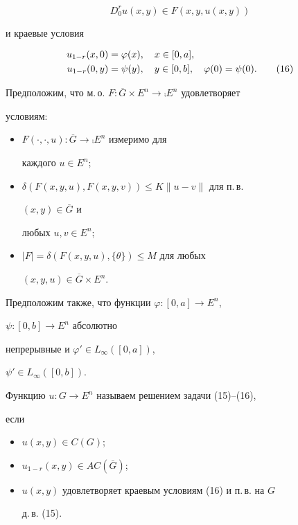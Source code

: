 \begin{equation} 


D_0^ru(x,y)\in F(x,y,u(x,y))\tag{15} 


\end{equation} 


и краевые условия 


\begin{align} 


u_{1-r}(x,0) &=\varphi(x),\quad x\in[0,a],\notag\\ 


u_{1-r}(0,y) &=\psi(y),\quad y\in[0,b],\quad \varphi(0)=\psi(0).\tag{16} 


\end{align} 


 


Предположим, что м.\,о. $F:\overline G\times E^n\to\comp E^n$ удовлетворяет 


условиям: 


\begin{itemize} 


\item[(A${}_1$)] $F(\cdot,\cdot,u):\overline G\to\comp E^n$ измеримо для 


каждого $u\in E^n$; 


\item[(A${}_2$)] $\delta(F(x,y,u),F(x,y,v))\le K\|u-v\|$ для п.\,в. 


$(x,y)\in\overline G$ и 


любых $u,v\in E^n$; 


\item[(A${}_3$)] $|F|=\delta(F(x,y,u),\{\theta\})\le M$ для любых 


$(x,y,u)\in\overline G\times E^n$. 


\end{itemize} 


Предположим также, что функции $\varphi:[0,a]\to E^n$, 


$\psi:[0,b]\to E^n$ абсолютно 


непрерывные и $\varphi'\in L_\infty([0,a])$, 


$\psi'\in L_\infty([0,b])$. 


 


\begin{defn} Функцию $u:G\to E^n$ называем решением задачи (15)--(16), 


если 


\begin{itemize} 


\item[(а)] $u(x,y)\in C(G)$; 


\item[(б)] $u_{1-r}(x,y)\in AC(\overline G)$; 


\item[(в)] $u(x,y)$ удовлетворяет краевым условиям (16) и п.\,в. на $G$ 


д.\,в. (15). 


\end{itemize} 


\end{defn} 


